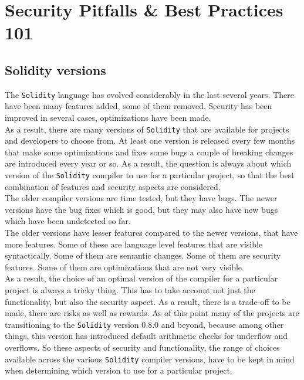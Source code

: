 \chapter{Security Pitfalls \& Best Practices 101}

\section{Solidity versions}
The \texttt{Solidity} language has evolved considerably in the last several years. There have been many features added, some of them removed. Security has been improved in several cases, optimizations have been made.\\

As a result, there are many versions of \texttt{Solidity} that are available for projects and developers to choose from. At least one version is released every few months that make some optimizations and fixes some bugs a couple of breaking changes are introduced every year or so. As a result, the question is always about which version of the \texttt{Solidity} compiler to use for a particular project, so that the best combination of features and security aspects are considered.\\

The older compiler versions are time tested, but they have bugs. The newer versions have the bug fixes which is good, but they may also have new bugs which have been undetected so far.\\

The older versions have lesser features compared to the newer versions, that have more features. Some of these are language level features that are visible syntactically. Some of them are semantic changes. Some of them are security features. Some of them are optimizations that are not very visible.\\

As a result, the choice of an optimal version of the compiler for a particular project is always a tricky thing. This has to take account not just the functionality, but also the security aspect. As a result, there is a trade-off to be made, there are risks as well as rewards. As of this point many of the projects are transitioning to the \texttt{Solidity} version 0.8.0 and beyond, because among other things, this version has introduced default arithmetic checks for underflow and overflows. So these aspects of security and functionality, the range of choices available across the various \texttt{Solidity} compiler versions, have to be kept in mind when determining which version to use for a particular project.

